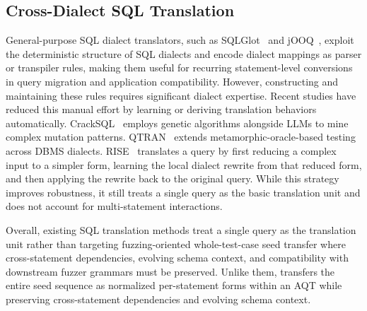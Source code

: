 \documentclass[conference]{IEEEtran}
\begin{document}
\subsection{Cross-Dialect SQL Translation}
General-purpose SQL dialect translators, such as SQLGlot~\cite{sqlglot} and jOOQ~\cite{jooq}, exploit the deterministic structure of SQL dialects and encode dialect mappings as parser or transpiler rules, making them useful for recurring statement-level conversions in query migration and application compatibility.
However, constructing and maintaining these rules requires significant dialect expertise.
Recent studies have reduced this manual effort by learning or deriving translation behaviors automatically.
CrackSQL~\cite{zhou2025cracking} employs genetic algorithms alongside LLMs to mine complex mutation patterns.
QTRAN~\cite{lin2025qtran} extends metamorphic-oracle-based testing across DBMS dialects.
RISE~\cite{xie2026rise} translates a query by first reducing a complex input to a simpler form, learning the local dialect rewrite from that reduced form, and then applying the rewrite back to the original query.
While this strategy improves robustness, it still treats a single query as the basic translation unit and does not account for multi-statement interactions.

Overall, existing SQL translation methods treat a single query as the translation unit rather than targeting fuzzing-oriented whole-test-case seed transfer where cross-statement dependencies, evolving schema context, and compatibility with downstream fuzzer grammars must be preserved. 
Unlike them, \tool{} transfers the entire seed sequence as normalized per-statement forms within an AQT while preserving cross-statement dependencies and evolving schema context.
\end{document}
